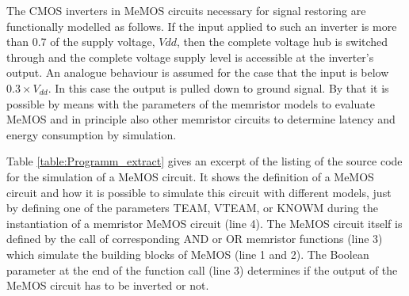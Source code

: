 \documentclass[pageno]{jpaper}
\begin{document}
The CMOS inverters in MeMOS circuits necessary for signal restoring are functionally modelled as follows. If the input applied to such an inverter is more than 0.7 of the supply voltage, $Vdd$, then the complete voltage hub is switched through and the complete voltage supply level is accessible at the inverter's output. An analogue behaviour is assumed for the case that the input is below $0.3 \times V_{dd}$. In this case the output is pulled down to ground signal. By that it is possible by means with the parameters of the memristor models to evaluate MeMOS and in principle also other memristor circuits to determine latency and energy consumption by simulation.

Table \ref{table:Programm_extract} gives an excerpt of the listing of the source code for the simulation of a MeMOS circuit. It shows the definition of a MeMOS circuit and how it is possible to simulate this circuit with different models, just by defining one of the parameters TEAM, VTEAM, or KNOWM during the instantiation of a memristor MeMOS circuit (line 4). The MeMOS circuit itself is defined by the call of corresponding AND or OR memristor functions (line 3) which simulate the building blocks of MeMOS (line 1 and 2). The Boolean parameter at the end of the function call (line 3) determines if the output of the MeMOS circuit has to be inverted or not. 
\end{document}
